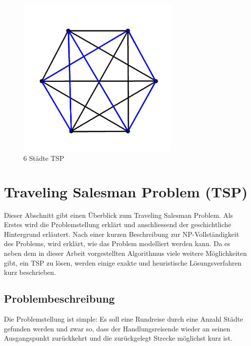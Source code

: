 \documentclass[11pt,a4paper]{article}
\begin{document}
\begin{figure}[H]
        \centering
        \includegraphics[width=8cm]{gfx/simple_tsp}
        \caption{6 Städte TSP}
        \label{img:simple_tsp}
\end{figure}

\newpage
\section{Traveling Salesman Problem (TSP)}
Dieser Abschnitt gibt einen Überblick zum Traveling Salesman Problem. Als Erstes wird die Problemstellung erklärt und anschliessend der geschichtliche Hintergrund erläutert. Nach einer kurzen Beschreibung zur NP-Vollständigkeit des Problems, wird erklärt, wie das Problem modelliert werden kann. Da es neben dem in dieser Arbeit vorgestellten Algorithmus viele weitere Möglichkeiten gibt, ein TSP zu lösen, werden einige exakte und heuristische Lösungsverfahren kurz beschrieben.

\subsection{Problembeschreibung}
Die Problemstellung ist simple: Es soll eine Rundreise durch eine Anzahl Städte gefunden werden und zwar so, dass der Handlungsreisende wieder an seinen Ausgangspunkt zurückkehrt und die zurückgelegt Strecke möglichst kurz ist.
\end{document}
